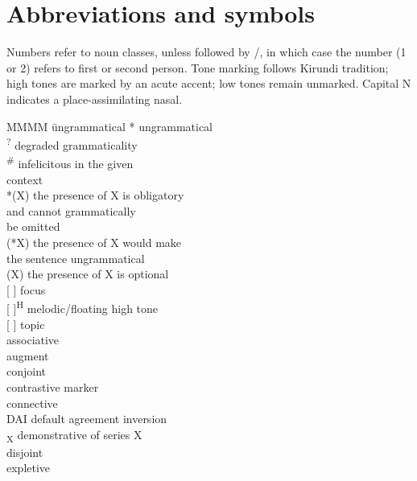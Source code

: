 \documentclass[output=paper]{langscibook}
\begin{document}
\section*{Abbreviations and symbols}

Numbers refer to noun classes, unless followed by \SG{}/\PL{}, in which case the number (1 or 2) refers to first or second person. Tone marking follows Kirundi tradition; high tones are marked by an acute accent; low tones remain unmarked. Capital N indicates a place-assimilating nasal.

\begin{multicols}{2}
\begin{tabbing}
MMMM \= ungrammatical\kill
* \> ungrammatical\\
\textsuperscript{?} \> degraded grammaticality\\
\textsuperscript{\#} \> infelicitous in the given \\ \>  context\\
*(X) \> the presence of X is obligatory \\ \> and cannot grammatically \\ \>  be omitted\\
(*X) \> the presence of X would make    \\ \>  the sentence ungrammatical\\
(X) \> the presence of X is optional\\
{}[ ]\textsuperscript{\FOC} \> focus\\
{}[ ]\textsuperscript{H} \> melodic/floating high tone\\
{}[ ]\textsuperscript{\TOP} \> topic\\
\ASS{} \> associative\\
\AUG{} \> augment\\
\CJ{} \> conjoint\\
\CM{} \> contrastive marker\\
\CONN{} \> connective\\
DAI \> default agreement inversion\\
\DEM{}\textsubscript{X} \> demonstrative of series X\\
\DJ{} \> disjoint\\
\EXP{} \> expletive\\

\end{tabbing}
\end{multicols}
\end{document}
